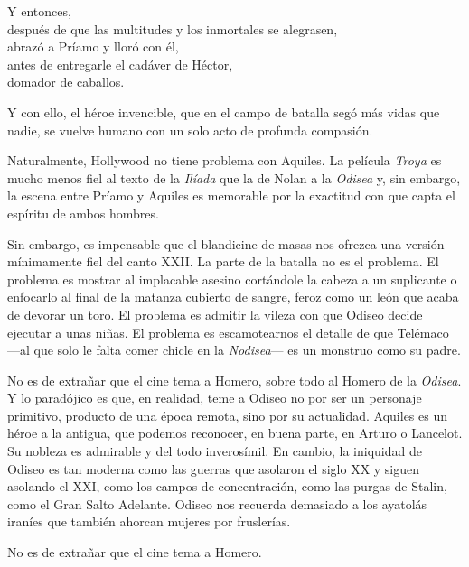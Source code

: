 \begin{versopropio}
Y entonces,\\
después de que las multitudes y los inmortales se alegrasen,\\
abrazó a Príamo y lloró con él,\\
antes de entregarle el cadáver de Héctor,\\
domador de caballos.
\end{versopropio}

Y con ello, el héroe invencible, que en el campo de batalla segó más vidas que nadie, se vuelve humano con un solo acto de profunda compasión.

Naturalmente, Hollywood no tiene problema con Aquiles. La película \emph{Troya} es mucho menos fiel al texto de la \emph{Ilíada} que la de Nolan a la \emph{Odisea} y, sin embargo, la escena entre Príamo y Aquiles es memorable por la exactitud con que capta el espíritu de ambos hombres.

Sin embargo, es impensable que el blandicine de masas nos ofrezca una versión mínimamente fiel del canto XXII. La parte de la batalla no es el problema. El problema es mostrar al implacable asesino cortándole la cabeza a un suplicante o enfocarlo al final de la matanza cubierto de sangre, feroz como un león que acaba de devorar un toro. El problema es admitir la vileza con que Odiseo decide ejecutar a unas niñas. El problema es escamotearnos el detalle de que Telémaco ---al que solo le falta comer chicle en la \emph{Nodisea}--- es un monstruo como su padre.

No es de extrañar que el cine tema a Homero, sobre todo al Homero de la \emph{Odisea}. Y lo paradójico es que, en realidad, teme a Odiseo no por ser un personaje primitivo, producto de una época remota, sino por su actualidad. Aquiles es un héroe a la antigua, que podemos reconocer, en buena parte, en Arturo o Lancelot. Su nobleza es admirable y del todo inverosímil. En cambio, la iniquidad de Odiseo es tan moderna como las guerras que asolaron el siglo XX y siguen asolando el XXI, como los campos de concentración, como las purgas de Stalin, como el Gran Salto Adelante. Odiseo nos recuerda demasiado a los ayatolás iraníes que también ahorcan mujeres por fruslerías.

No es de extrañar que el cine tema a Homero.
